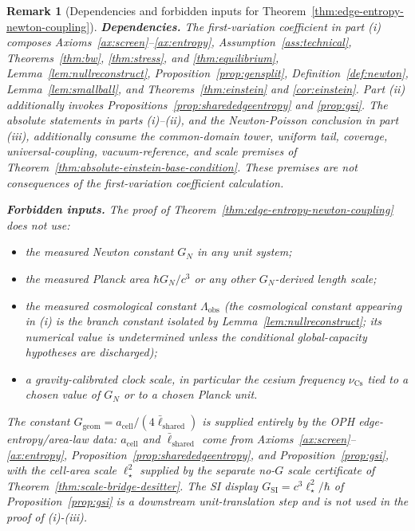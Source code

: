 \documentclass[11pt]{article}
\newtheorem{remark}[theorem]{Remark}
\begin{document}
\begin{remark}[Dependencies and forbidden inputs for Theorem~\ref{thm:edge-entropy-newton-coupling}]\label{rem:edge-entropy-newton-coupling-scope}
\textbf{Dependencies.} The first-variation coefficient in part (i) composes
Axioms~\ref{ax:screen}--\ref{ax:entropy}, Assumption~\ref{ass:technical},
Theorems~\ref{thm:bw}, \ref{thm:stress}, and \ref{thm:equilibrium},
Lemma~\ref{lem:nullreconstruct}, Proposition~\ref{prop:gensplit},
Definition~\ref{def:newton}, Lemma~\ref{lem:smallball}, and
Theorems~\ref{thm:einstein} and \ref{cor:einstein}. Part (ii) additionally
invokes Propositions~\ref{prop:sharededgeentropy} and \ref{prop:gsi}. The
absolute statements in parts (i)--(ii), and the Newton-Poisson conclusion in
part (iii), additionally consume the common-domain tower, uniform tail,
coverage, universal-coupling, vacuum-reference, and scale premises of
Theorem~\ref{thm:absolute-einstein-base-condition}. These premises are not
consequences of the first-variation coefficient calculation.

\textbf{Forbidden inputs.} The proof of Theorem~\ref{thm:edge-entropy-newton-coupling} does not use:
\begin{itemize}[leftmargin=2em]
\item the measured Newton constant \(G_N\) in any unit system;
\item the measured Planck area \(\hbar G_N/c^3\) or any other \(G_N\)-derived length scale;
\item the measured cosmological constant \(\Lambda_{\mathrm{obs}}\) (the cosmological constant appearing in (i) is the branch constant isolated by Lemma~\ref{lem:nullreconstruct}; its numerical value is undetermined unless the conditional global-capacity hypotheses are discharged);
\item a gravity-calibrated clock scale, in particular the cesium frequency \(\nu_{\mathrm{Cs}}\) tied to a chosen value of \(G_N\) or to a chosen Planck unit.
\end{itemize}
The constant \(G_{\mathrm{geom}}=a_{\mathrm{cell}}/(4\bar\ell_{\mathrm{shared}})\) is supplied entirely by the OPH edge-entropy/area-law data: \(a_{\mathrm{cell}}\) and \(\bar\ell_{\mathrm{shared}}\) come from Axioms~\ref{ax:screen}--\ref{ax:entropy}, Proposition~\ref{prop:sharededgeentropy}, and Proposition~\ref{prop:gsi}, with the cell-area scale \(\ell_\star^2\) supplied by the separate no-\(G\) scale certificate of Theorem~\ref{thm:scale-bridge-desitter}. The SI display \(G_{\mathrm{SI}}=c^3\ell_\star^2/\hbar\) of Proposition~\ref{prop:gsi} is a downstream unit-translation step and is not used in the proof of (i)-(iii).


\end{remark}
\end{document}
